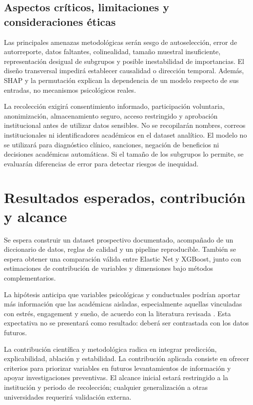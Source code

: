 \documentclass[11pt,a4paper]{article}
\begin{document}
\subsection{Aspectos críticos, limitaciones y consideraciones éticas}

Las principales amenazas metodológicas serán sesgo de autoselección, error de autorreporte, datos faltantes, colinealidad, tamaño muestral insuficiente, representación desigual de subgrupos y posible inestabilidad de importancias. El diseño transversal impedirá establecer causalidad o dirección temporal. Además, SHAP y la permutación explican la dependencia de un modelo respecto de sus entradas, no mecanismos psicológicos reales.

La recolección exigirá consentimiento informado, participación voluntaria, anonimización, almacenamiento seguro, acceso restringido y aprobación institucional antes de utilizar datos sensibles. No se recopilarán nombres, correos institucionales ni identificadores académicos en el dataset analítico. El modelo no se utilizará para diagnóstico clínico, sanciones, negación de beneficios ni decisiones académicas automáticas. Si el tamaño de los subgrupos lo permite, se evaluarán diferencias de error para detectar riesgos de inequidad.

\section{Resultados esperados, contribución y alcance}

Se espera construir un dataset prospectivo documentado, acompañado de un diccionario de datos, reglas de calidad y un pipeline reproducible. También se espera obtener una comparación válida entre Elastic Net y XGBoost, junto con estimaciones de contribución de variables y dimensiones bajo métodos complementarios.

La hipótesis anticipa que variables psicológicas y conductuales podrían aportar más información que las académicas aisladas, especialmente aquellas vinculadas con estrés, engagement y sueño, de acuerdo con la literatura revisada \cite{cuevas2025,mudlo2025,rodrigues2024}. Esta expectativa no se presentará como resultado: deberá ser contrastada con los datos futuros.

La contribución científica y metodológica radica en integrar predicción, explicabilidad, ablación y estabilidad. La contribución aplicada consiste en ofrecer criterios para priorizar variables en futuros levantamientos de información y apoyar investigaciones preventivas. El alcance inicial estará restringido a la institución y periodo de recolección; cualquier generalización a otras universidades requerirá validación externa.
\end{document}
